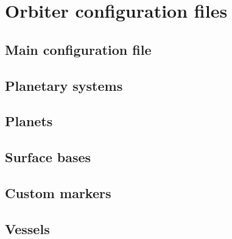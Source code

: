 \documentclass[Orbiter Developer Manual.tex]{subfiles}
\begin{document}
\section{Orbiter configuration files}

\subsection{Main configuration file}

\subsection{Planetary systems}

\subsection{Planets}

\subsection{Surface bases}

\subsection{Custom markers}

\subsection{Vessels}
\end{document}
